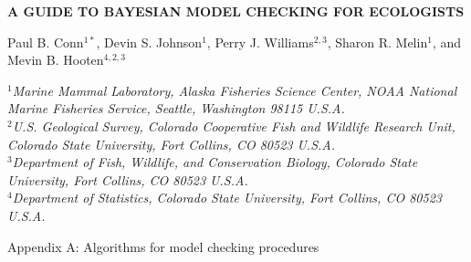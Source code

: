 \documentclass[12pt,english]{article}
\begin{document}
\begin{center} \bf {\large A GUIDE TO BAYESIAN MODEL CHECKING FOR ECOLOGISTS}

\vspace{0.7cm}
Paul B. Conn$^{1*}$, Devin S. Johnson$^1$, Perry J. Williams$^{2,3}$, Sharon R. Melin$^1$, and Mevin
    B. Hooten$^{4,2,3}$
\end{center}
\vspace{0.5cm}

\rm
\small

\it $^1$Marine Mammal Laboratory, Alaska Fisheries Science Center,
NOAA National Marine Fisheries Service,
Seattle, Washington 98115 U.S.A.\\

\it $^2$U.S. Geological Survey, Colorado Cooperative Fish and Wildlife Research Unit, Colorado State University, Fort Collins, CO 80523 U.S.A.\\

\it $^3$Department of Fish, Wildlife, and Conservation Biology, Colorado State University, Fort Collins, CO 80523 U.S.A.\\

\it $^4$Department of Statistics, Colorado State University, Fort Collins, CO 80523 U.S.A.\\

\raggedbottom
\vspace{.5in}

\rm
Appendix A: Algorithms for model checking procedures
\bigskip

\vspace{.3in}

\doublespacing
\end{document}
